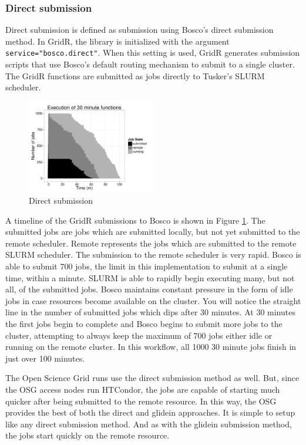 \documentclass[conference]{IEEEtran}
\begin{document}
\subsubsection{Direct submission}
Direct submission is defined as submission using Bosco's direct submission method.  In GridR, the library is initialized with the argument \texttt{service="bosco.direct"}.  When this setting is used, GridR generates submission scripts that use Bosco's default routing mechanism to submit to a single cluster.  The GridR functions are submitted as jobs directly to Tusker's SLURM scheduler.

\begin{figure}[ht!]
\centering
\includegraphics[width=0.5\textwidth]{images/30minplot.pdf}

\caption{Direct submission}
\label{fig:directsubmit}
\end{figure}

A timeline of the GridR submissions to Bosco is shown in Figure \ref{fig:directsubmit}.  The submitted jobs are jobs which are submitted locally, but not yet submitted to the remote scheduler.  Remote represents the jobs which are submitted to the remote SLURM scheduler.  The submission to the remote scheduler is very rapid.  Bosco is able to submit 700 jobs, the limit in this implementation to submit at a single time, within a minute.  SLURM is able to rapidly begin executing many, but not all, of the submitted jobs.  Bosco maintains constant pressure in the form of idle jobs in case resources become available on the cluster.  You will notice the straight line in the number of submitted jobs which dips after 30 minutes.  At 30 minutes the first jobs begin to complete and Bosco begins to submit more jobs to the cluster, attempting to always keep the maximum of 700 jobs either idle or running on the remote cluster.  In this workflow, all 1000 30 minute jobs finish in just over 100 minutes.

The Open Science Grid runs use the direct submission method as well.  But, since the OSG access nodes run HTCondor, the jobs are capable of starting much quicker after being submitted to the remote resource.  In this way, the OSG provides the best of both the direct and glidein approaches.  It is simple to setup like any direct submission method.  And as with the glidein submission method, the jobs start quickly on the remote resource.
\end{document}
